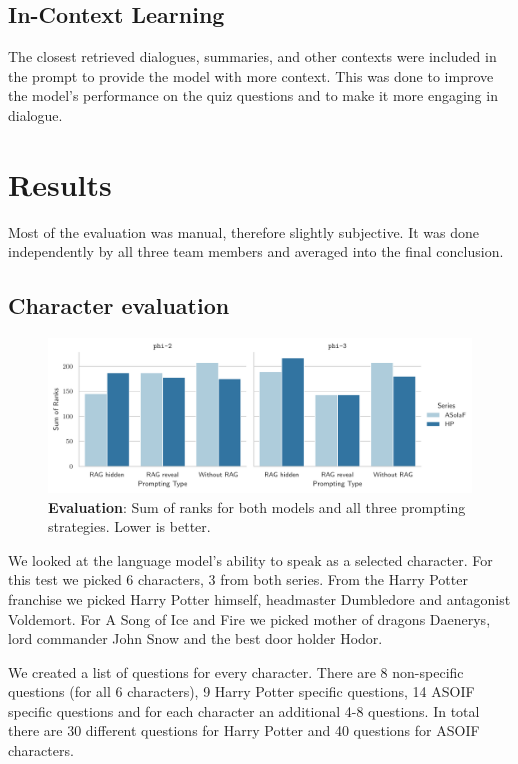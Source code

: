 \documentclass[fleqn,moreauthors,10pt]{ds_report}
\begin{document}
\subsection*{In-Context Learning}

The closest retrieved dialogues, summaries, and other contexts were included in the prompt to provide the model with more context. This was done to improve the model's performance on the quiz questions and to make it more engaging in dialogue.


\section*{Results}
Most of the evaluation was manual, therefore slightly subjective.
It was done independently by all three team members and averaged into the final conclusion.

\subsection*{Character evaluation}

\begin{figure}[hbt]
	\centering
	\includegraphics[width=0.8\linewidth]{questioners-results.pdf}
	\caption{\textbf{Evaluation}: Sum of ranks for both models and all three prompting strategies. Lower is better.}
	\label{fig:character_evaluation_results}
\end{figure}


We looked at the language model's ability to speak as a selected character.
For this test we picked 6 characters, 3 from both series.
From the Harry Potter franchise we picked Harry Potter himself, headmaster Dumbledore and antagonist Voldemort.
For A Song of Ice and Fire we picked mother of dragons Daenerys, lord commander John Snow and the best door holder Hodor.

We created a list of questions for every character.
There are 8 non-specific questions (for all 6 characters), 9 Harry Potter specific questions, 14 ASOIF specific questions
and for each character an additional 4-8 questions.
In total there are 30 different questions for Harry Potter and 40 questions for ASOIF characters.
\end{document}
